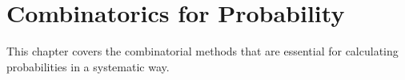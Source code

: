 \chapter{Combinatorics for Probability}

This chapter covers the combinatorial methods that are essential for calculating probabilities in a systematic way.

